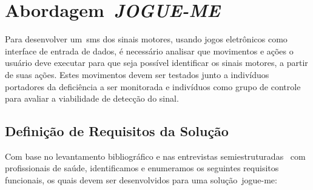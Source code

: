 \chapter{Abordagem~\textit{JOGUE-ME}}\label{chapter:abordagem_gahme}
Para desenvolver um~\ac{sms} dos sinais motores, usando jogos eletrônicos como interface de entrada de dados, é necessário analisar que movimentos e ações o usuário deve executar para que seja possível identificar os sinais motores, a partir de suas ações. Estes movimentos devem ser testados junto a indivíduos portadores da deficiência a ser monitorada e indivíduos como grupo de controle para avaliar a viabilidade de detecção do sinal.

\section{Definição de Requisitos da Solução}\label{section:requisitos_solucao}
Com base no levantamento bibliográfico e nas entrevistas semiestruturadas~\cite{FLI04} com profissionais de saúde, identificamos e enumeramos os seguintes requisitos funcionais, os quais devem ser desenvolvidos para uma solução~\ac{jogue-me}:

